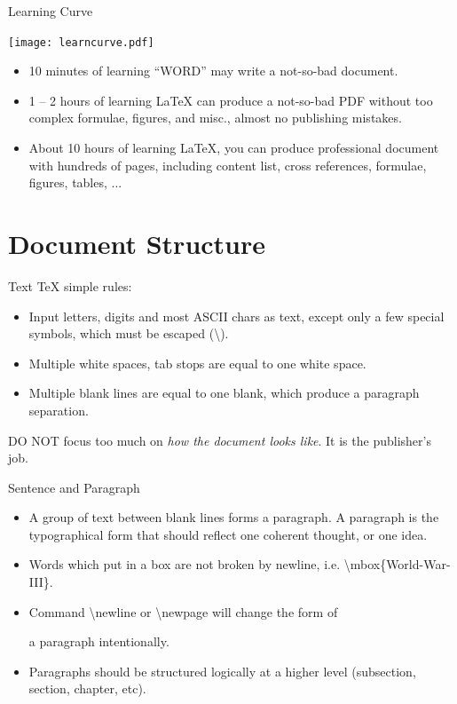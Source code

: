 \documentclass[10pt,t]{beamer}
\begin{document}
\begin{frame}{Learning Curve}
\begin{center}
    \texttt{[image: learncurve.pdf]}
\end{center}

\begin{itemize}
    \item 10 minutes of learning ``WORD'' may write a not-so-bad document.
    \item 1 -- 2 hours of learning \LaTeX{} can produce a not-so-bad
        PDF without too complex formulae, figures, and misc., almost
        no publishing mistakes.
    \item About 10 hours of learning \LaTeX{}, you can produce
        professional document with hundreds
        of pages, including content list, cross references,
        formulae, figures, tables, ...
\end{itemize}
\end{frame}

\section{Document Structure}
\begin{frame}{Text}
    \TeX{} simple rules:
\begin{itemize}
    \item Input letters, digits and most ASCII chars as text, except only
        a few special symbols, which must be escaped
        (\alert{\textbackslash}).
    \item Multiple white spaces, tab stops are equal to one white space.
    \item Multiple blank lines are equal to one blank, which produce
        a paragraph separation.
\end{itemize}

    \alert{DO NOT} focus too much on {\em how the document looks like}.
    It is the publisher's job.

\end{frame}

\begin{frame}{Sentence and Paragraph}
\begin{itemize}
    \item A group of text between blank lines forms a paragraph.
        A paragraph is the typographical form that should reflect
        one \alert{coherent} thought, or one idea.
    \item Words which put in a box are not broken by newline, i.e.
        \textbackslash mbox\{World-War-III\}.
    \item Command \alert{\textbackslash newline} or
        \alert{\textbackslash newpage} will change the form of

        a paragraph intentionally.
    \item Paragraphs should be structured logically at a higher level
        (\alert{subsection}, \alert{section}, \alert{chapter}, etc).
\end{itemize}
\end{frame}
\end{document}
